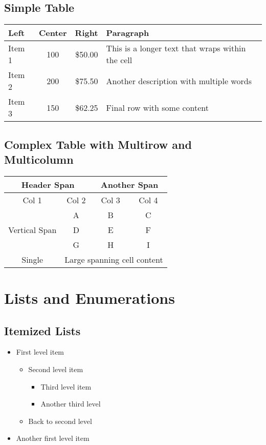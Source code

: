 \documentclass[12pt]{article}
\begin{document}
\subsection{Simple Table}
\begin{center}
\begin{tabular}{|l|c|r|p{3cm}|}
\hline
Left & Center & Right & Paragraph \\
\hline
Item 1 & 100 & \$50.00 & This is a longer text that wraps within the cell \\
Item 2 & 200 & \$75.50 & Another description with multiple words \\
Item 3 & 150 & \$62.25 & Final row with some content \\
\hline
\end{tabular}
\end{center}

\subsection{Complex Table with Multirow and Multicolumn}
\begin{center}
\begin{tabular}{|c|c|c|c|}
\hline
\multicolumn{2}{|c|}{Header Span} & \multicolumn{2}{c|}{Another Span} \\
\hline
Col 1 & Col 2 & Col 3 & Col 4 \\
\hline
\multirow{3}{*}{Vertical Span} & A & B & C \\
\cline{2-4}
& D & E & F \\
\cline{2-4}
& G & H & I \\
\hline
Single & \multicolumn{3}{c|}{Large spanning cell content} \\
\hline
\end{tabular}
\end{center}

\section{Lists and Enumerations}

\subsection{Itemized Lists}
\begin{itemize}
\item First level item
\begin{itemize}
\item Second level item
\begin{itemize}
\item Third level item
\item Another third level
\end{itemize}
\item Back to second level
\end{itemize}
\item Another first level item
\end{itemize}
\end{document}
